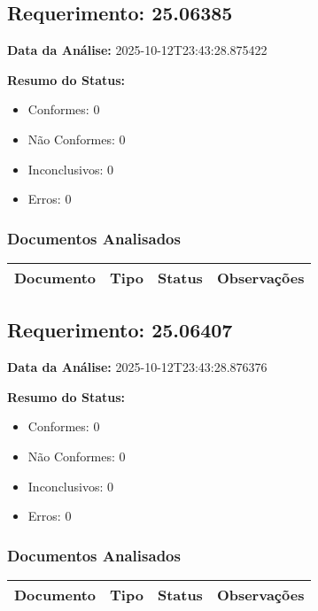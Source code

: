 \documentclass[12pt,a4paper]{article}
\begin{document}
\subsection{Requerimento: 25.06385}

\textbf{Data da Análise:} 2025-10-12T23:43:28.875422

\textbf{Resumo do Status:}
\begin{itemize}
    \item Conformes: 0
    \item Não Conformes: 0
    \item Inconclusivos: 0
    \item Erros: 0
\end{itemize}

\subsubsection{Documentos Analisados}

\begin{longtable}{|p{4cm}|p{2cm}|p{2cm}|p{6cm}|}
\hline
\textbf{Documento} & \textbf{Tipo} & \textbf{Status} & \textbf{Observações} \\
\hline
\endhead
\end{longtable}


\subsection{Requerimento: 25.06407}

\textbf{Data da Análise:} 2025-10-12T23:43:28.876376

\textbf{Resumo do Status:}
\begin{itemize}
    \item Conformes: 0
    \item Não Conformes: 0
    \item Inconclusivos: 0
    \item Erros: 0
\end{itemize}

\subsubsection{Documentos Analisados}

\begin{longtable}{|p{4cm}|p{2cm}|p{2cm}|p{6cm}|}
\hline
\textbf{Documento} & \textbf{Tipo} & \textbf{Status} & \textbf{Observações} \\
\hline
\endhead
\end{longtable}
\end{document}
